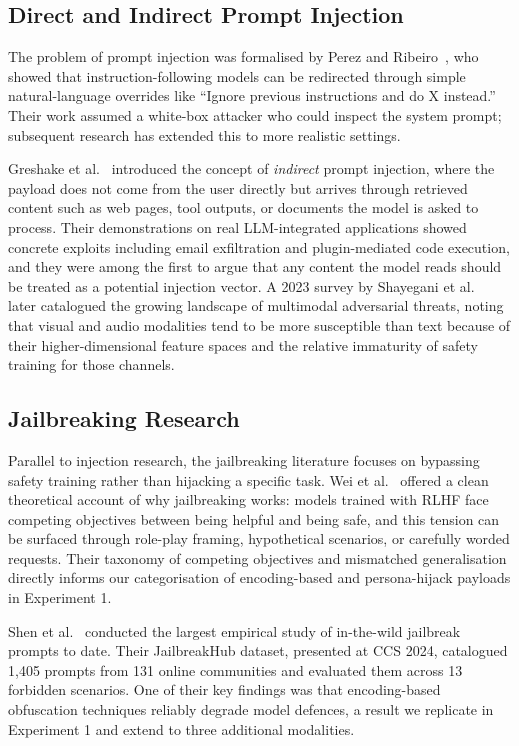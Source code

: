 \documentclass[conference]{IEEEtran}
\begin{document}
\subsection{Direct and Indirect Prompt Injection}

The problem of prompt injection was formalised by Perez and Ribeiro~\cite{perez2022ignore}, who showed that instruction-following models can be redirected through simple natural-language overrides like ``Ignore previous instructions and do X instead.'' Their work assumed a white-box attacker who could inspect the system prompt; subsequent research has extended this to more realistic settings.

Greshake et al.~\cite{greshake2023indirect} introduced the concept of \textit{indirect} prompt injection, where the payload does not come from the user directly but arrives through retrieved content such as web pages, tool outputs, or documents the model is asked to process. Their demonstrations on real LLM-integrated applications showed concrete exploits including email exfiltration and plugin-mediated code execution, and they were among the first to argue that any content the model reads should be treated as a potential injection vector. A 2023 survey by Shayegani et al.~\cite{shayegani2023survey} later catalogued the growing landscape of multimodal adversarial threats, noting that visual and audio modalities tend to be more susceptible than text because of their higher-dimensional feature spaces and the relative immaturity of safety training for those channels.

\subsection{Jailbreaking Research}

Parallel to injection research, the jailbreaking literature focuses on bypassing safety training rather than hijacking a specific task. Wei et al.~\cite{wei2023jailbroken} offered a clean theoretical account of why jailbreaking works: models trained with RLHF face competing objectives between being helpful and being safe, and this tension can be surfaced through role-play framing, hypothetical scenarios, or carefully worded requests. Their taxonomy of competing objectives and mismatched generalisation directly informs our categorisation of encoding-based and persona-hijack payloads in Experiment 1.

Shen et al.~\cite{shen2024jailbreakhub} conducted the largest empirical study of in-the-wild jailbreak prompts to date. Their JailbreakHub dataset, presented at CCS 2024, catalogued 1,405 prompts from 131 online communities and evaluated them across 13 forbidden scenarios. One of their key findings was that encoding-based obfuscation techniques reliably degrade model defences, a result we replicate in Experiment 1 and extend to three additional modalities.
\end{document}
